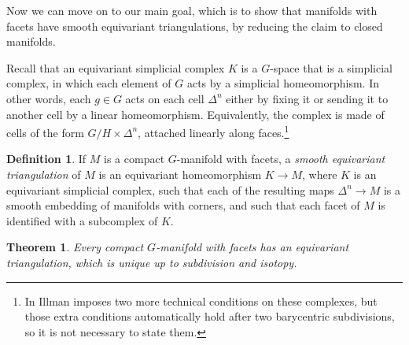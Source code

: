 \documentclass[11pt]{amsart}
\newtheorem{thm}{Theorem}[section]
\theoremstyle{definition}
\newtheorem{defn}{Definition}[section]
\numberwithin{equation}{section}
\numberwithin{figure}{section}
\newcommand{\ourdefn}[1]{{\it #1}}
\begin{document}
Now we can move on to our main goal, which is to show that manifolds with facets have smooth equivariant triangulations, by reducing the claim to closed manifolds.

Recall that an equivariant simplicial complex $K$ is a $G$-space that is a simplicial complex, in which each element of $G$ acts by a simplicial homeomorphism. In other words, each $g \in G$ acts on each cell $\Delta^n$ either by fixing it or sending it to another cell by a linear homeomorphism. Equivalently, the complex is made of cells of the form $G/H \times \Delta^n$, attached linearly along faces.\footnote{In \cite{illman_finite} Illman imposes two more technical conditions on these complexes, but those extra conditions automatically hold after two barycentric subdivisions, so it is not necessary to state them.}

\begin{defn}\label{df:equivariant_triangulation}
	If $M$ is a compact $G$-manifold with facets, a \ourdefn{smooth equivariant triangulation} of $M$ is an equivariant homeomorphism $K \to M$, where $K$ is an equivariant simplicial complex, such that each of the resulting maps $\Delta^n \to M$ is a smooth embedding of manifolds with corners, and such that each facet of $M$ is identified with a subcomplex of $K$.
\end{defn}

\begin{thm}\label{equivariant_triangulation_unique}
	Every compact $G$-manifold with facets has an equivariant triangulation, which is unique up to subdivision and isotopy.
\end{thm}
\end{document}
